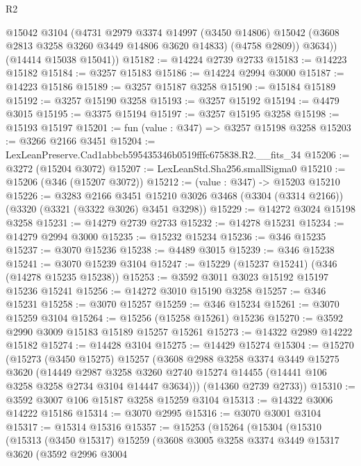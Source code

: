\begin{lexlean}{R2}
\begin{coremodule}
          @15042
          @3104
          (@4731
            @2979
            @3374
            @14997
            (@3450 @14806)
            @15042
            (@3608 @2813 @3258 @3260 @3449 @14806 @3620 @14833)
            (@4758 @2809))
          @3634))
      (@14414 @15038 @15041))
@15182 := @14224 @2739 @2733
@15183 := @14223 @15182
@15184 := @3257 @15183
@15186 := @14224 @2994 @3000
@15187 := @14223 @15186
@15189 := @3257 @15187 @3258
@15190 := @15184 @15189
@15192 := @3257 @15190 @3258
@15193 := @3257 @15192
@15194 := @4479 @3015
@15195 := @3375 @15194
@15197 := @3257 @15195 @3258
@15198 := @15193 @15197
@15201 := fun (value : @347) => @3257 @15198 @3258
@15203 := @3266 @2166 @3451
@15204 := LexLeanPreserve.Cad1abbcb595435346b0519fffc675838.R2.__fits_34
@15206 := @3272 (@15204 @3072)
@15207 := LexLeanStd.Sha256.smallSigma0
@15210 := @15206 (@346 (@15207 @3072))
@15212 := (value : @347) -> @15203 @15210
@15226 := @3283
    @2166
    @3451
    @15210
    @3026
    @3468
    (@3304 (@3314 @2166))
    (@3320 (@3321 (@3322 @3026) @3451 @3298))
@15229 := @14272 @3024 @15198 @3258
@15231 := @14279 @2739 @2733
@15232 := @14278 @15231
@15234 := @14279 @2994 @3000
@15235 := @15232 @15234
@15236 := @346 @15235
@15237 := @3070 @15236
@15238 := @4489 @3015
@15239 := @346 @15238
@15241 := @3070 @15239 @3104
@15247 := @15229 (@15237 @15241) (@346 (@14278 @15235 @15238))
@15253 := @3592 @3011 @3023 @15192 @15197 @15236 @15241
@15256 := @14272 @3010 @15190 @3258
@15257 := @346 @15231
@15258 := @3070 @15257
@15259 := @346 @15234
@15261 := @3070 @15259 @3104
@15264 := @15256 (@15258 @15261) @15236
@15270 := @3592 @2990 @3009 @15183 @15189 @15257 @15261
@15273 := @14322 @2989 @14222 @15182
@15274 := @14428 @3104
@15275 := @14429 @15274
@15304 := @15270
    (@15273
      (@3450 @15275)
      @15257
      (@3608
        @2988
        @3258
        @3374
        @3449
        @15275
        @3620
        (@14449
          @2987
          @3258
          @3260
          @2740
          @15274
          @14455
          (@14441 @106 @3258 @3258 @2734 @3104 @14447 @3634)))
      (@14360 @2739 @2733))
@15310 := @3592 @3007 @106 @15187 @3258 @15259 @3104
@15313 := @14322 @3006 @14222 @15186
@15314 := @3070 @2995
@15316 := @3070 @3001 @3104
@15317 := @15314 @15316
@15357 := @15253
    (@15264
      (@15304
        (@15310
          (@15313
            (@3450 @15317)
            @15259
            (@3608
              @3005
              @3258
              @3374
              @3449
              @15317
              @3620
              (@3592
                @2996
                @3004

\end{coremodule}
\end{lexlean}
